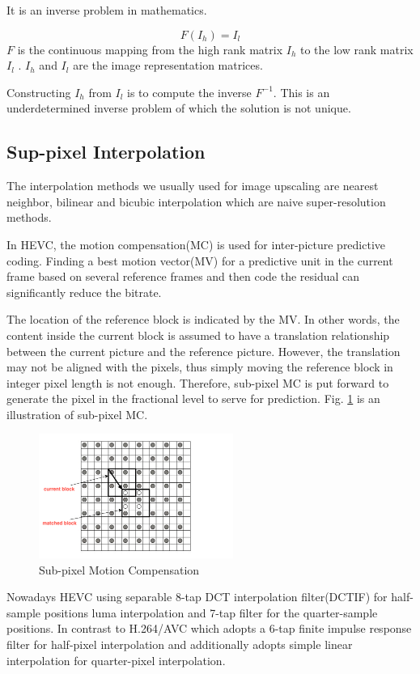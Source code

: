 \documentclass[12pt,journal,compsoc]{IEEEtran}
\begin{document}
It is an inverse problem in mathematics.

\begin{equation} 
\label{eqn_example} 
F(I_h) = I_l
\end{equation}
$F$ is the continuous mapping from the high rank matrix $I_h$ to the low rank matrix $I_l$ . $I_h$ and $I_l$ are the image representation matrices.

Constructing $I_h$ from $I_l$ is to compute the inverse $F^{-1}$. This is an underdetermined inverse problem of which the solution is not unique.

\subsection{Sup-pixel Interpolation}
The interpolation methods we usually used for image upscaling are nearest neighbor, bilinear and bicubic interpolation which are naive super-resolution methods. 

In HEVC, the motion compensation(MC) is used for inter-picture predictive coding. Finding a best motion vector(MV) for a predictive unit in the current frame based on several reference frames and then code the residual can significantly reduce the bitrate.

The location of the reference block is indicated by the MV. In other words, the content inside the current block is assumed to have a translation relationship between the current picture and the reference picture. However, the translation may not be aligned with the pixels, thus simply moving the reference block in integer pixel length is not enough. Therefore, sub-pixel MC is put forward to generate the pixel in the fractional level to serve for prediction. Fig. \ref{fig_1} is an illustration of sub-pixel MC.

\begin{figure}[!t] 
\centering
\includegraphics[width=2.5in]{1_ME.png}
\caption{Sub-pixel Motion Compensation}
\label{fig_1}
\end{figure}


Nowadays HEVC using separable 8-tap DCT interpolation filter(DCTIF) for half-sample positions luma interpolation and 7-tap filter for the quarter-sample positions. In contrast to H.264/AVC which adopts a 6-tap finite impulse response filter for half-pixel interpolation and additionally adopts simple linear interpolation for quarter-pixel interpolation.
\end{document}

